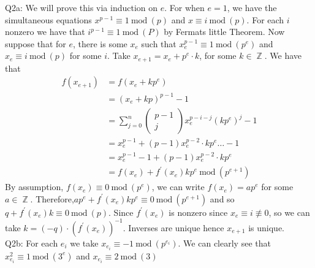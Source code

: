 \documentclass[letterpaper]{article}
\DeclareMathOperator{\Z}{\mathbb{Z}}
\newcommand{\Mod}[1]{\ \mathrm{mod}\ (#1)}
\begin{document}
\noindent Q2a: We will prove this via induction on $e$. For when $e=1$, we have the simultaneous equations  \newline $x^{p-1}\equiv 1 \Mod{p}$ and $x\equiv i \Mod{p}$. For each $i$ nonzero we have that $i^{p-1}\equiv 1 \Mod{P}$ by Fermats little Theorem.
 Now suppose that for $e$, there is some $x_e$ such that $x_e^{p-1}\equiv 1 \Mod{p^e}$ and $x_e\equiv i \Mod{p}$ for some $i$. Take $x_{e+1} = x_e + p^e\cdot k$, for some $k\in \Z$. We have that 
\begin{align*}
    f(x_{e+1}) & = f(x_e+kp^e)
    \\ & = (x_e + kp)^{p-1} - 1
    \\ & = \sum_{j=0}^n \begin{pmatrix}  p-1 \\ j\end{pmatrix} x_e^{p-i-j} (kp^e)^{j} - 1
    \\ & = x_e^{p-1} + (p-1)x_e^{p-2} \cdot kp^e \dots -1
    \\ & = x_e^{p-1}-1+ (p-1)x_e^{p-2}\cdot kp^e
    \\ & = f(x_e)+ f^\prime(x_e)kp^e \Mod{p^{e+1}}
\end{align*}
By assumption, $f(x_e)\equiv 0 \Mod{p^e}$, we can write $f(x_e) = ap^e$ for some $a\in \Z$. Therefore,\newline  $ap^e + f^\prime(x_e)kp^e \equiv 0 \Mod{p^{e+1}}$ and so $q+f^\prime(x_e)k \equiv 0 \Mod{p}$. Since $f^\prime(x_e)$ is nonzero since $x_e\equiv i \not \equiv 0$, so we can take $k=(-q)\cdot (f^\prime(x_e))^{-1}$. Inverses are unique hence $x_{e+1}$ is unique. 
\newline \\ Q2b: For each $e_i$ we take $x_{e_i} \equiv -1 \Mod{p^{e_i}}$. We can clearly see that $x_{e_i}^2 \equiv 1 \Mod{3^e}$ and $x_{e_i}\equiv 2 \Mod{3}$

 
\end{document}
